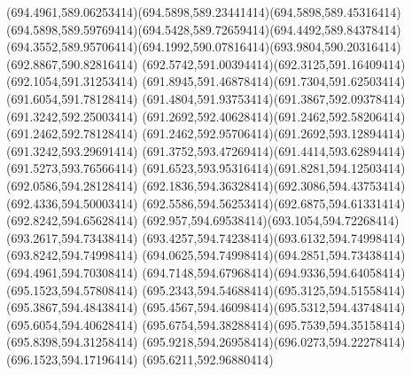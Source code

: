 {{	\curveto(694.4961,589.06253414)(694.5898,589.23441414)(694.5898,589.45316414)
	\curveto(694.5898,589.59769414)(694.5428,589.72659414)(694.4492,589.84378414)
	\curveto(694.3552,589.95706414)(694.1992,590.07816414)(693.9804,590.20316414)
	\lineto(692.8867,590.82816414)
	\curveto(692.5742,591.00394414)(692.3125,591.16409414)(692.1054,591.31253414)
	\curveto(691.8945,591.46878414)(691.7304,591.62503414)(691.6054,591.78128414)
	\curveto(691.4804,591.93753414)(691.3867,592.09378414)(691.3242,592.25003414)
	\curveto(691.2692,592.40628414)(691.2462,592.58206414)(691.2462,592.78128414)
	\curveto(691.2462,592.95706414)(691.2692,593.12894414)(691.3242,593.29691414)
	\curveto(691.3752,593.47269414)(691.4414,593.62894414)(691.5273,593.76566414)
	\curveto(691.6523,593.95316414)(691.8281,594.12503414)(692.0586,594.28128414)
	\curveto(692.1836,594.36328414)(692.3086,594.43753414)(692.4336,594.50003414)
	\curveto(692.5586,594.56253414)(692.6875,594.61331414)(692.8242,594.65628414)
	\curveto(692.957,594.69538414)(693.1054,594.72268414)(693.2617,594.73438414)
	\curveto(693.4257,594.74238414)(693.6132,594.74998414)(693.8242,594.74998414)
	\curveto(694.0625,594.74998414)(694.2851,594.73438414)(694.4961,594.70308414)
	\curveto(694.7148,594.67968414)(694.9336,594.64058414)(695.1523,594.57808414)
	\curveto(695.2343,594.54688414)(695.3125,594.51558414)(695.3867,594.48438414)
	\curveto(695.4567,594.46098414)(695.5312,594.43748414)(695.6054,594.40628414)
	\curveto(695.6754,594.38288414)(695.7539,594.35158414)(695.8398,594.31258414)
	\curveto(695.9218,594.26958414)(696.0273,594.22278414)(696.1523,594.17196414)
	\closepath
	\moveto(695.6211,592.96880414)
}
}
